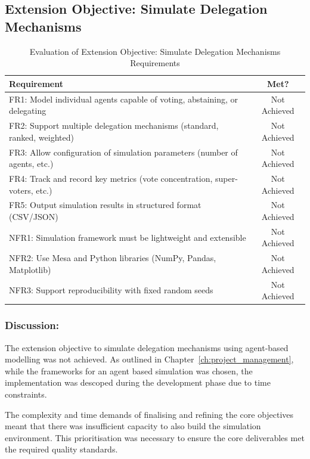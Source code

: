 \subsection{Extension Objective: Simulate Delegation Mechanisms}

\begin{table}[H]
\centering
\begin{tabular}{|p{9cm}|c|}
\hline
\textbf{Requirement} & \textbf{Met?} \\ \hline
FR1: Model individual agents capable of voting, abstaining, or delegating & Not Achieved \\ \hline
FR2: Support multiple delegation mechanisms (standard, ranked, weighted) & Not Achieved \\ \hline
FR3: Allow configuration of simulation parameters (number of agents, etc.) & Not Achieved \\ \hline
FR4: Track and record key metrics (vote concentration, super-voters, etc.) & Not Achieved \\ \hline
FR5: Output simulation results in structured format (CSV/JSON) & Not Achieved \\ \hline
NFR1: Simulation framework must be lightweight and extensible & Not Achieved \\ \hline
NFR2: Use Mesa and Python libraries (NumPy, Pandas, Matplotlib) & Not Achieved \\ \hline
NFR3: Support reproducibility with fixed random seeds & Not Achieved \\ \hline
\end{tabular}
\caption{Evaluation of Extension Objective: Simulate Delegation Mechanisms Requirements}
\label{tab:objective5_requirements}
\end{table}

\subsubsection{Discussion:}

The extension objective to simulate delegation mechanisms using agent-based modelling was not achieved. As outlined in Chapter~\ref{ch:project_management}, while the frameworks for an agent based simulation was chosen, the implementation was descoped during the development phase due to time constraints.

The complexity and time demands of finalising and refining the core objectives meant that there was insufficient capacity to also build the simulation environment. This prioritisation was necessary to ensure the core deliverables met the required quality standards.

